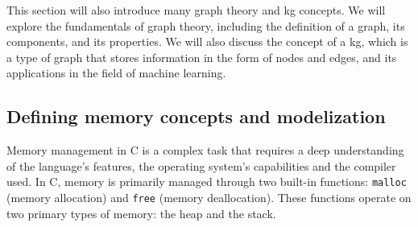     This section will also introduce many graph theory and \acrfull{kg} concepts. We will explore the fundamentals of graph theory, including the definition of a graph, its components, and its properties. We will also discuss the concept of a \acrfull{kg}, which is a type of graph that stores information in the form of nodes and edges, and its applications in the field of machine learning.

    \subsection{Defining memory concepts and modelization}
    Memory management in C is a complex task that requires a deep understanding of the language's features, the operating system's capabilities and the compiler used. In C, memory is primarily managed through two built-in functions: \texttt{malloc} (memory allocation) and \texttt{free} (memory deallocation). These functions operate on two primary types of memory: the heap and the stack.

